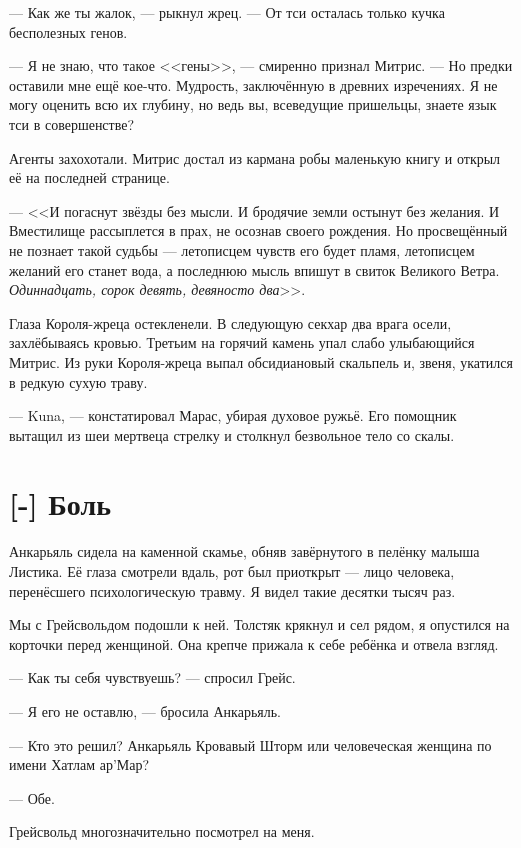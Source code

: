 --- Как же ты жалок, --- рыкнул жрец.
--- От тси осталась только кучка бесполезных генов.

--- Я не знаю, что такое <<гены>>, --- смиренно признал Митрис.
--- Но предки оставили мне ещё кое-что.
Мудрость, заключённую в древних изречениях.
Я не могу оценить всю их глубину, но ведь вы, всеведущие пришельцы, знаете язык тси в совершенстве?

Агенты захохотали.
Митрис достал из кармана робы маленькую книгу и открыл её на последней странице.

--- <<И погаснут звёзды без мысли.
И бродячие земли остынут без желания.
И Вместилище рассыплется в прах, не осознав своего рождения.
Но просвещённый не познает такой судьбы --- летописцем чувств его будет пламя, летописцем желаний его станет вода, а последнюю мысль впишут в свиток Великого Ветра.
\emph{Одиннадцать, сорок девять, девяносто два}>>.

Глаза Короля-жреца остекленели.
В следующую секхар два врага осели, захлёбываясь кровью.
Третьим на горячий камень упал слабо улыбающийся Митрис.
Из руки Короля-жреца выпал обсидиановый скальпель и, звеня, укатился в редкую сухую траву.

--- Kuna\FM, --- констатировал Марас, убирая духовое ружьё.
Его помощник вытащил из шеи мертвеца стрелку и столкнул безвольное тело со скалы.

\section{[-] Боль}

\textspace

Анкарьяль сидела на каменной скамье, обняв завёрнутого в пелёнку малыша Листика.
Её глаза смотрели вдаль, рот был приоткрыт --- лицо человека, перенёсшего психологическую травму.
Я видел такие десятки тысяч раз.

Мы с Грейсвольдом подошли к ней.
Толстяк крякнул и сел рядом, я опустился на корточки перед женщиной.
Она крепче прижала к себе ребёнка и отвела взгляд.

--- Как ты себя чувствуешь? --- спросил Грейс.

--- Я его не оставлю, --- бросила Анкарьяль.

--- Кто это решил?
Анкарьяль Кровавый Шторм или человеческая женщина по имени Хатлам ар’Мар?

--- Обе.

Грейсвольд многозначительно посмотрел на меня.

